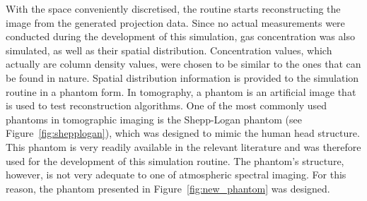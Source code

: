 With the space conveniently discretised, the routine starts
reconstructing the image from the generated projection data. Since no
actual measurements were conducted during the development of this
simulation, gas concentration was also simulated, as well as their
spatial distribution. Concentration values, which actually are column
density values, were chosen to be similar to the ones that can be found
in nature. Spatial distribution information is provided to the
simulation routine in a phantom form. In tomography, a phantom is an
artificial image that is used to test reconstruction algorithms. One of
the most commonly used phantoms in tomographic imaging is the
Shepp-Logan phantom (see Figure~\ref{fig:shepplogan}), which was
designed to mimic the human head structure. This phantom is very readily
available in the relevant literature and was therefore used for the
development of this simulation routine. The phantom's structure,
however, is not very adequate to one of atmospheric spectral imaging.
For this reason, the phantom presented in Figure~\ref{fig:new_phantom}
was designed.

